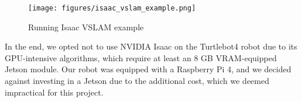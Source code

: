 \begin{figure}[htbp]
	\centering
	\texttt{[image: figures/isaac\_vslam\_example.png]}
	\caption{Running Isaac VSLAM example}
	\label{fig:isaac_vslam_example}
\end{figure}

In the end, we opted not to use NVIDIA Isaac on the Turtlebot4 robot due to its GPU-intensive algorithms, which require at least an 8 GB VRAM-equipped Jetson module. Our robot was equipped with a Raspberry Pi 4, and we decided against investing in a Jetson due to the additional cost, which we deemed impractical for this project.
